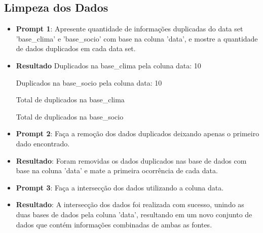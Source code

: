 \documentclass[12pt, a4paper, onecolumn]{article}
\begin{document}
    \subsection*{Limpeza dos Dados}
    \begin{itemize}
        \item \textbf{Prompt 1}: Apresente quantidade de informações duplicadas do data set 'base\_clima' e 'base\_socio' com base na coluna 'data', e mostre a quantidade de dados duplicados em cada data set.
        
        \item \textbf{Resultado}
        Duplicados na base\_clima pela coluna data: 10

        Duplicados na base\_socio pela coluna data: 10
        
        Total de duplicados na base\_clima
        
        Total de duplicados na base\_socio

        \item \textbf{Prompt 2}: Faça a remoção dos dados duplicados deixando apenas o primeiro dado encontrado.
        
        \item \textbf{Resultado}: Foram removidas os dados duplicados nas base de dados com base na coluna 'data' e mate a primeira ocorrência de cada data.
        
        \item \textbf{Prompt 3}: Faça a intersecção dos dados utilizando a coluna data.
        
        \item \textbf{Resultado}: A intersecção dos dados foi realizada com sucesso, unindo as duas bases de dados pela coluna 'data', resultando em um novo conjunto de dados que contém informações combinadas de ambas as fontes.
    \end{itemize}
\end{document}
